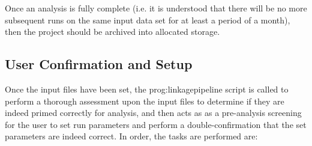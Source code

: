Once an analysis is fully complete (i.e. it is understood that there will be no more subsequent runs on the same input data set for at least a period of a month), then the project should be archived into allocated storage.


\subsection{User Confirmation and Setup}

Once the input files have been set, the \gls{prog:linkagepipeline} script is called to perform a thorough assessment upon the input files to determine if they are indeed primed correctly for analysis, and then acts as as a pre-analysis screening for the user to set run parameters and perform a double-confirmation that the set parameters are indeed correct. In order, the tasks are performed are:

